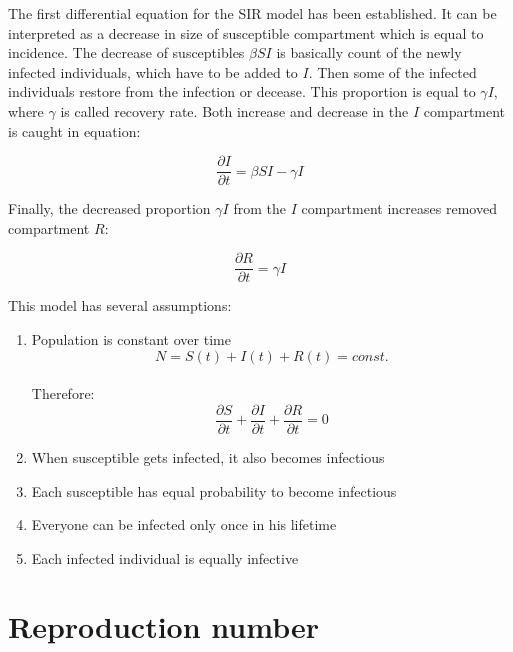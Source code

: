 \documentclass[
  digital, %
  oneside, %
  lof,     %
  lot,     %
]{fithesis4}
\begin{document}
The first differential equation for the SIR model has 
been established. It can be interpreted as a decrease 
in size of susceptible compartment which is equal 
to incidence.
The decrease of susceptibles $\beta S I$ is basically 
count of the newly infected individuals, which have 
to be added to $I$. 
Then some of the infected individuals restore from 
the infection or decease. 
This proportion is equal to $\gamma I$, where $\gamma$ 
is called recovery rate. Both increase and decrease in 
the $I$ compartment is caught in equation:

\begin{equation}
	\frac{\partial{I}}{\partial{t}} = \beta S I - \gamma I
\end{equation}

Finally, the decreased proportion $\gamma I$ from the 
$I$ compartment increases removed compartment $R$:

\begin{equation}
	\frac{\partial{R}}{\partial{t}} = \gamma I
\end{equation}

This model has several assumptions:

\begin{enumerate}
  \item Population is constant over time \\
    \begin{equation}
      N = S(t) + I(t) + R(t) = const.
    \end{equation} \\
    Therefore: \\
    \begin{equation}
      \frac{\partial{S}}{\partial{t}} + \frac{\partial{I}}{\partial{t}} + \frac{\partial{R}}{\partial{t}} = 0
    \end{equation}
  \item When susceptible gets infected, it also becomes infectious
  \item Each susceptible has equal probability to become infectious
  \item Everyone can be infected only once in his lifetime
  \item Each infected individual is equally infective \cite{volz2018}
\end{enumerate}



\section{Reproduction number}
\end{document}
